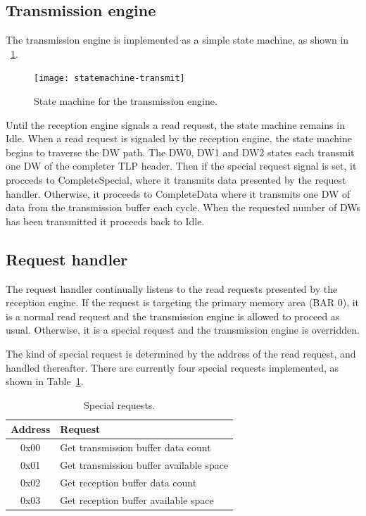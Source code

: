 \subsection{Transmission engine}

The transmission engine is implemented as a simple state machine, as shown in \figurename~\ref{fig:statemachine-transmit}.

\begin{figure}[!ht]
    \centering
    \texttt{[image: statemachine-transmit]}
    \caption[Transmission engine state machine]{
        State machine for the transmission engine.
    }
    \label{fig:statemachine-transmit}
\end{figure}

Until the reception engine signals a read request, the state machine remains in Idle.
When a read request is signaled by the reception engine, the state machine begins to traverse the DW path.
The DW0, DW1 and DW2 states each transmit one DW of the completer TLP header.
Then if the special request signal is set, it procceds to CompleteSpecial, where it transmits data presented by the request handler.
Otherwise, it proceeds to CompleteData where it transmits one DW of data from the transmission buffer each cycle.
When the requested number of DWs has been transmitted it proceeds back to Idle.

\subsection{Request handler}

The request handler continually listens to the read requests presented by the reception engine.
If the request is targeting the primary memory area (BAR 0), it is a normal read request and the transmission engine is allowed to proceed as usual.
Otherwise, it is a special request and the transmission engine is overridden.

The kind of special request is determined by the address of the read request, and handled thereafter.
There are currently four special requests implemented, as shown in Table~\ref{tab:requests}.

\begin{table}[!ht]
    \renewcommand{\arraystretch}{1.3}
    \centering
    \begin{tabular}{c|l}
        \bfseries Address & \bfseries Request \\
        \hline
        0x00 & Get transmission buffer data count \\
        0x01 & Get transmission buffer available space \\
        0x02 & Get reception buffer data count \\
        0x03 & Get reception buffer available space \\
    \end{tabular}
    \caption{Special requests.}
    \label{tab:requests}
\end{table}

